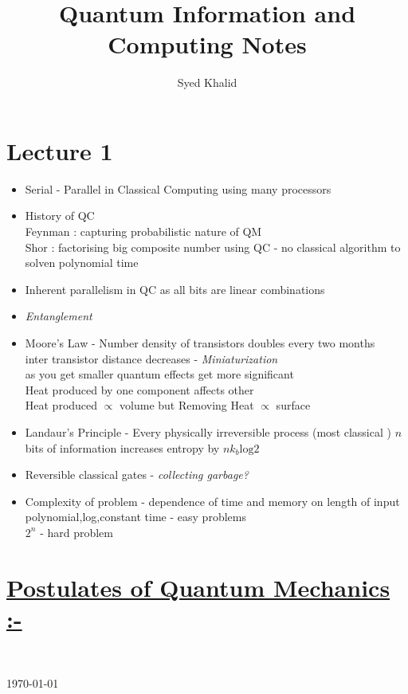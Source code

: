 \documentclass{article}
\title{\textbf{Quantum Information and Computing Notes}}
\author{Syed Khalid}
\begin{document}
\maketitle
\section{Lecture 1}
\begin{itemize}
    \item Serial - Parallel in Classical Computing using many processors
    \item History of QC \\
    Feynman : capturing probabilistic nature of QM\\
    Shor : factorising big composite number  using QC - no classical algorithm to solven polynomial time\\
    
    \item Inherent parallelism in QC as all bits are linear combinations
    \item \textit{Entanglement} 
    \item Moore's Law - Number density of transistors doubles every two months\\
    inter transistor distance decreases - \textit{Miniaturization}\\
    as you get smaller quantum effects get more significant 
    \\ Heat produced by one component affects other \\
    Heat produced $\propto$ volume but Removing Heat $\propto$ surface
    \item  Landaur's Principle - Every physically irreversible process (most classical ) 
    $n$  bits of information increases entropy by $nk_{b} \mathrm{log} 2$
    \item Reversible classical gates - \textit{collecting garbage?}
    \item Complexity of problem - dependence of time and memory on length of input\\
    polynomial,log,constant time - easy problems\\
    $2^{n}$ - hard problem\\ 

\end{itemize}

\section{\uline{Postulates of Quantum Mechanics :-}} 
\
\begin{flushright}
\today
\end{flushright}
\end{document}
